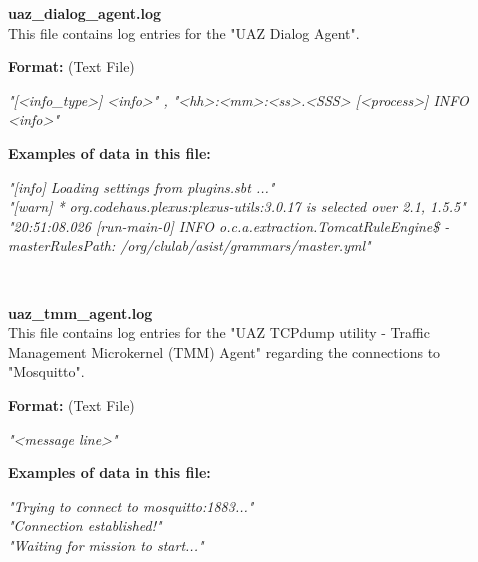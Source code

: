 \begin{description}
\begin{addmargin}[0em]{0em}
    \label{uaz_dialog_agent.log}
    \begin{addmargin}[1em]{0em} %
        \textbf{uaz\_dialog\_agent.log}\\
        This file contains log entries for the "UAZ Dialog Agent".
        \begin{addmargin}[1em]{0em}
            \textbf{Format:} (Text File)
            \begin{addmargin}[1em]{0em}
                \textit{"[<info\_type>] <info>" , "<hh>:<mm>:<ss>.<SSS> [<process>] INFO <info>"}
            \end{addmargin}
        \end{addmargin}
        \begin{addmargin}[1em]{0em}
            \textbf{Examples of data in this file:}
            \begin{addmargin}[1em]{0em}\textit{"[info] Loading settings from plugins.sbt ..."\\
                "[warn]  * org.codehaus.plexus:plexus-utils:3.0.17 is selected over {2.1, 1.5.5}"\\
                "20:51:08.026 [run-main-0] INFO  o.c.a.extraction.TomcatRuleEngine\$ - masterRulesPath: /org/clulab/asist/grammars/master.yml"}
            \end{addmargin}
        \end{addmargin}
    \end{addmargin} %
    \textbf{\\}

    \label{uaz_tmm_agent.log}
    \begin{addmargin}[1em]{0em} %
        \textbf{uaz\_tmm\_agent.log}\\
        This file contains log entries for the "UAZ TCPdump utility - Traffic Management Microkernel (TMM) Agent"
        regarding the connections to "Mosquitto".
        \begin{addmargin}[1em]{0em}
            \textbf{Format:} (Text File)
            \begin{addmargin}[1em]{0em}
                \textit{"<message line>"}
            \end{addmargin}
        \end{addmargin}
        \begin{addmargin}[1em]{0em}
            \textbf{Examples of data in this file:}
            \begin{addmargin}[1em]{0em}\textit{"Trying to connect to mosquitto:1883..."\\
                "Connection established!"\\
                "Waiting for mission to start..."}
            \end{addmargin}
        \end{addmargin}
    \end{addmargin} %
    \textbf{\\}


\end{addmargin}
\end{description}
